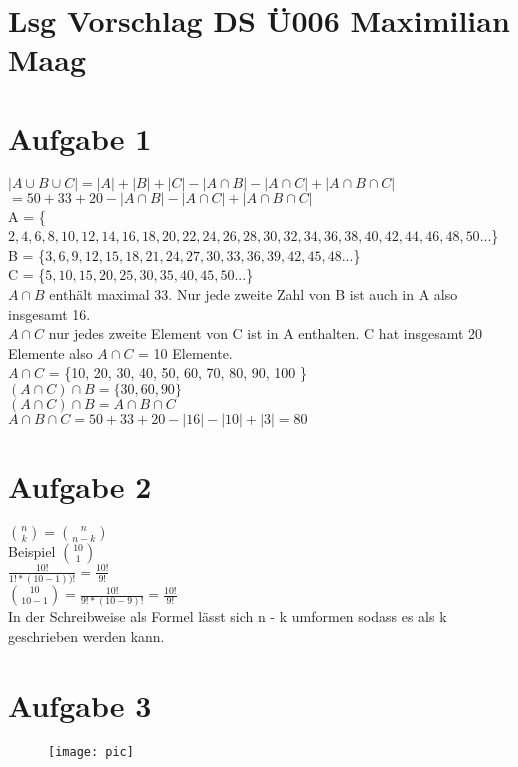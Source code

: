 \documentclass{article}
\begin{document}
	\section*{Lsg Vorschlag DS Ü006 Maximilian Maag}
	\section*{Aufgabe 1}
	$|A \cup B \cup C| = |A| + |B| + |C| - |A \cap B| - |A \cap C| + |A \cap B \cap C|$ \\
	$= 50 + 33 + 20 - |A \cap B| - |A \cap C| + |A \cap B \cap C|$ \\
	A = \{$ 2, 4, 6, 8, 10, 12, 14, 16, 18, 20, 22, 24, 26, 28, 30, 32, 34, 36, 38, 40, 42, 44, 46, 48, 50 ...$\} \\
	B = \{$3, 6, 9, 12, 15, 18, 21, 24, 27, 30, 33, 36, 39, 42, 45, 48 ... $\} \\
	C = \{$5, 10, 15, 20, 25, 30, 35, 40, 45, 50 ...$\} \\
	$A \cap B$ enthält maximal 33. Nur jede zweite Zahl von B ist auch in A also insgesamt 16. \\
	$A \cap C$ nur jedes zweite Element von C ist in A enthalten. C hat insgesamt 20 Elemente also $A \cap C$ = 10 Elemente. \\
	$A \cap C$ = \{10, 20, 30, 40, 50, 60, 70, 80, 90, 100 \}\\
	
	$(A \cap C) \cap B = \{30, 60, 90\}$ \\
	$(A \cap C) \cap B = A \cap B \cap C$ \\
	$A \cap B \cap C= 50 + 33 + 20 - |16| - |10| + |3| = 80$ \\
	\section*{Aufgabe 2}
	$\binom{n}{k} = \binom{n}{n - k}$ \\
	Beispiel $\binom{10}{1}$ \\
	$\frac{10!}{1! * (10 -1))!} = \frac{10!}{9!}$ \\
	$\binom{10}{10 - 1} = \frac{10!}{9! * (10 - 9)!} = \frac{10!}{9!}$ \\
	In der Schreibweise als Formel lässt sich n - k umformen sodass es als k geschrieben werden kann. 
	\section*{Aufgabe 3}
	\begin{figure}
		\texttt{[image: pic]}
	\end{figure}
\end{document}
